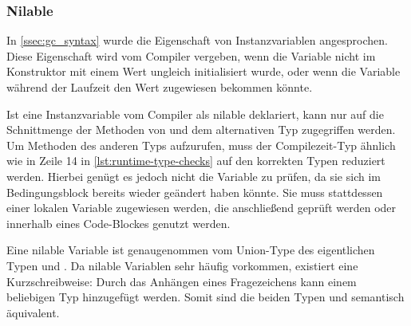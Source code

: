 \subsubsection{Nilable}
\label{sssec:gct_nilable}

In \cref{ssec:gc_syntax} wurde die Eigenschaft  von
Instanzvariablen angesprochen.  Diese Eigenschaft wird vom Compiler vergeben,
wenn die Variable nicht im Konstruktor mit einem Wert ungleich 
initialisiert wurde, oder wenn die Variable während der Laufzeit den Wert
 zugewiesen bekommen könnte.

Ist eine Instanzvariable vom Compiler als nilable deklariert, kann nur auf die
Schnittmenge der Methoden von  und dem alternativen Typ zugegriffen
werden.  Um Methoden des anderen Typs aufzurufen, muss der Compilezeit-Typ
ähnlich wie in Zeile 14 in \cref{lst:runtime-type-checks} auf den korrekten
Typen reduziert werden.  Hierbei genügt es jedoch nicht die Variable zu prüfen,
da sie sich im Bedingungsblock bereits wieder geändert haben könnte.  Sie muss
stattdessen einer lokalen Variable zugewiesen werden, die anschließend geprüft
werden oder innerhalb eines  Code-Blockes genutzt werden.

Eine nilable Variable ist genaugenommen vom Union-Type des eigentlichen Typen
und .  Da nilable Variablen sehr häufig vorkommen, existiert eine
Kurzschreibweise: Durch das Anhängen eines Fragezeichens kann einem beliebigen
Typ  hinzugefügt werden.  Somit sind die beiden Typen
 und  semantisch äquivalent.
